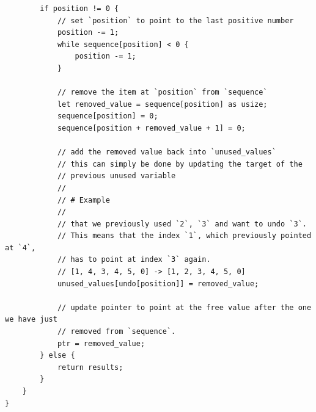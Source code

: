 \begin{verbatim}
        if position != 0 {
            // set `position` to point to the last positive number
            position -= 1;
            while sequence[position] < 0 {
                position -= 1;
            }

            // remove the item at `position` from `sequence`
            let removed_value = sequence[position] as usize;
            sequence[position] = 0;
            sequence[position + removed_value + 1] = 0;

            // add the removed value back into `unused_values`
            // this can simply be done by updating the target of the
            // previous unused variable
            //
            // # Example
            //
            // that we previously used `2`, `3` and want to undo `3`.
            // This means that the index `1`, which previously pointed at `4`, 
            // has to point at index `3` again.
            // [1, 4, 3, 4, 5, 0] -> [1, 2, 3, 4, 5, 0]
            unused_values[undo[position]] = removed_value;

            // update pointer to point at the free value after the one we have just
            // removed from `sequence`.
            ptr = removed_value;
        } else {
            return results;
        }
    }
}
\end{verbatim}
